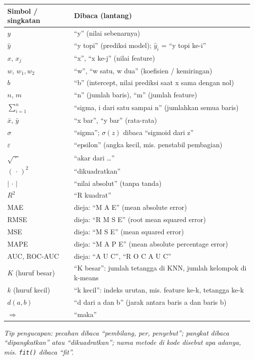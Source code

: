 \documentclass[11pt]{article}
\begin{document}
\renewcommand{\arraystretch}{1.3}
\begin{longtable}{@{}p{} p{}@{}}
\hline
\textbf{Simbol / singkatan} & \textbf{Dibaca (lantang)} \\ \hline
\endhead
$y$ & ``y'' (nilai sebenarnya) \\
$\hat{y}$ & ``y topi'' (prediksi model); $\hat{y}_i$ = ``y topi ke-i'' \\
$x$, $x_j$ & ``x'', ``x ke-j'' (nilai feature) \\
$w$, $w_1, w_2$ & ``w'', ``w satu, w dua'' (koefisien / kemiringan) \\
$b$ & ``b'' (intercept, nilai prediksi saat x sama dengan nol) \\
$n$, $m$ & ``n'' (jumlah baris), ``m'' (jumlah feature) \\
$\sum_{i=1}^{n}$ & ``sigma, i dari satu sampai n'' (jumlahkan semua baris) \\
$\bar{x}$, $\bar{y}$ & ``x bar'', ``y bar'' (rata-rata) \\
$\sigma$ & ``sigma''; $\sigma(z)$ dibaca ``sigmoid dari z'' \\
$\varepsilon$ & ``epsilon'' (angka kecil, mis. penstabil pembagian) \\
$\sqrt{\;\cdot\;}$ & ``akar dari \ldots'' \\
$(\,\cdot\,)^2$ & ``dikuadratkan'' \\
$|\,\cdot\,|$ & ``nilai absolut'' (tanpa tanda) \\
$R^2$ & ``R kuadrat'' \\
MAE & dieja: ``M A E'' (mean absolute error) \\
RMSE & dieja: ``R M S E'' (root mean squared error) \\
MSE & dieja: ``M S E'' (mean squared error) \\
MAPE & dieja: ``M A P E'' (mean absolute percentage error) \\
AUC, ROC-AUC & dieja: ``A U C'', ``R O C A U C'' \\
$K$ (huruf besar) & ``K besar'': jumlah tetangga di KNN, jumlah kelompok di k-means \\
$k$ (huruf kecil) & ``k kecil'': indeks urutan, mis. feature ke-k, tetangga ke-k \\
$d(a,b)$ & ``d dari a dan b'' (jarak antara baris a dan baris b) \\
$\Rightarrow$ & ``maka'' \\
\hline
\end{longtable}

\vspace{2mm}
\emph{Tip pengucapan: pecahan dibaca ``pembilang, per, penyebut''; pangkat dibaca ``dipangkatkan'' atau ``dikuadratkan''; nama metode di kode disebut apa adanya, mis. \texttt{fit()} dibaca ``fit''.}
\end{document}
